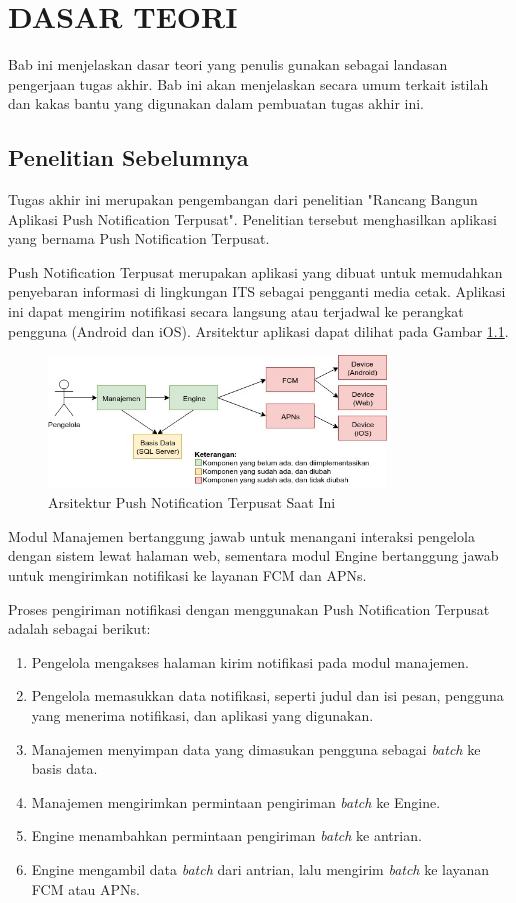 \chapter{DASAR TEORI}
\par Bab ini menjelaskan dasar teori yang penulis gunakan sebagai landasan pengerjaan tugas akhir. Bab ini akan menjelaskan secara umum terkait istilah dan kakas bantu yang digunakan dalam pembuatan tugas akhir ini.

\section{Penelitian Sebelumnya}
\par Tugas akhir ini merupakan pengembangan dari penelitian "Rancang Bangun Aplikasi Push Notification Terpusat". Penelitian tersebut menghasilkan aplikasi yang bernama Push Notification Terpusat.
\par Push Notification Terpusat merupakan aplikasi yang dibuat untuk memudahkan penyebaran informasi di lingkungan ITS sebagai pengganti media cetak. Aplikasi ini dapat mengirim notifikasi secara langsung atau terjadwal ke perangkat pengguna (Android dan iOS). Arsitektur aplikasi dapat dilihat pada Gambar \ref{img:arsitektur-pnt_lama}.
\begin{figure}[H]
	\centering\includegraphics[width=0.8\textwidth]{bab2/img/arsitektur-push_notification_terpusat_lama.jpg}
	\caption{Arsitektur Push Notification Terpusat Saat Ini}
	\label{img:arsitektur-pnt_lama}
\end{figure}
\par Modul Manajemen bertanggung jawab untuk menangani interaksi pengelola dengan sistem lewat halaman web, sementara modul Engine bertanggung jawab untuk mengirimkan notifikasi ke layanan FCM dan APNs.
\par Proses pengiriman notifikasi dengan menggunakan Push Notification Terpusat adalah sebagai berikut:
\begin{enumerate}
	\item Pengelola mengakses halaman kirim notifikasi pada modul manajemen.
	\item Pengelola memasukkan data notifikasi, seperti judul dan isi pesan, pengguna yang menerima notifikasi, dan aplikasi yang digunakan.
	\item Manajemen menyimpan data yang dimasukan pengguna sebagai \textit{batch} ke basis data.
	\item Manajemen mengirimkan permintaan pengiriman \textit{batch} ke Engine.
	\item Engine menambahkan permintaan pengiriman \textit{batch} ke antrian.
	\item Engine mengambil data \textit{batch} dari antrian, lalu mengirim \textit{batch} ke layanan FCM atau APNs.
\end{enumerate}
